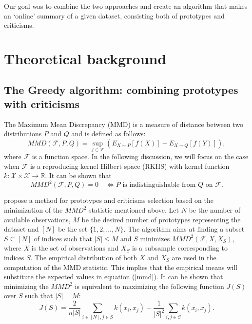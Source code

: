 \documentclass{article}
\begin{document}
	Our goal was to combine the two approaches and create an algorithm that makes an `online' summary of a given dataset, consisting both of prototypes and criticisms. 
	
	\section{Theoretical background}
	\subsection{The Greedy algorithm: combining prototypes with criticisms}
	The Maximum Mean Discrepancy (MMD) is a measure of distance between two distributions $P$ and $Q$ and is defined as follows:
	\begin{equation}\label{mmd}
	MMD(\mathcal{F}, P, Q) = \sup_{f \in \mathcal{F}} \left(E_{X \sim P} [f(X)] - E_{X \sim Q} [f(Y)] \right),
	\end{equation}
	where $\mathcal{F}$ is a function space. In the following discussion, we will focus on the case when $\mathcal{F}$ is a reproducing kernel Hilbert space (RKHS) with kernel function $k: \mathcal{X} \times \mathcal{X} \to \mathbb{R}$. It can be shown that 
	$$
	MMD^2(\mathcal{F}, P, Q) = 0 \quad \iff  P\textrm{ is indistinguishable from }Q\textrm{ on }\mathcal{F}.
	$$
	
	\cite{kim} propose a method for prototypes and criticisms selection based on the minimization of the $MMD^2$ statistic mentioned above. 
	Let $N$ be the number of available observations, $M$ be the desired number of prototypes representing the dataset and $[N]$ be the set $\{1,2, \ldots, N\}$. The algorithm aims at finding a subset $S\subseteq [N]$ of indices such that $|S|\leq M$ and $S$ minimizes $MMD^2(\mathcal{F}, X, X_S)$, where $X$ is the set of observations and $X_S$ is a subsample corresponding to indices $S$.
	The empirical distribution of both $X$ and $X_S$ are used in the computation of the MMD statistic. This implies that the empirical means will substitute the expected values in equation (\ref{mmd}). 
	It can be shown that minimizing the $MMD^2$ is equivalent to maximizing the following function $J(S)$ over $S$ such that $|S|=M$:
	\begin{equation}
	J(S) = \frac{2}{n |S|} \sum_{i \in [N], j \in S} k(x_i, x_j) - \frac{1}{|S|^2}\sum_{i, j \in S} k(x_i, x_j).
	\end{equation}
	
\end{document}

